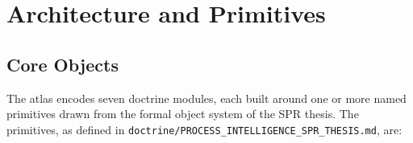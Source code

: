 
\section{Architecture and Primitives}
\label{sec:atlas-arch}

\subsection{Core Objects}
\label{sec:atlas-arch-objects}

The atlas encodes seven doctrine modules, each built around one or more named
primitives drawn from the formal object system of the SPR thesis. The
primitives, as defined in \texttt{doctrine/PROCESS\_INTELLIGENCE\_SPR\_THESIS.md},
are:

